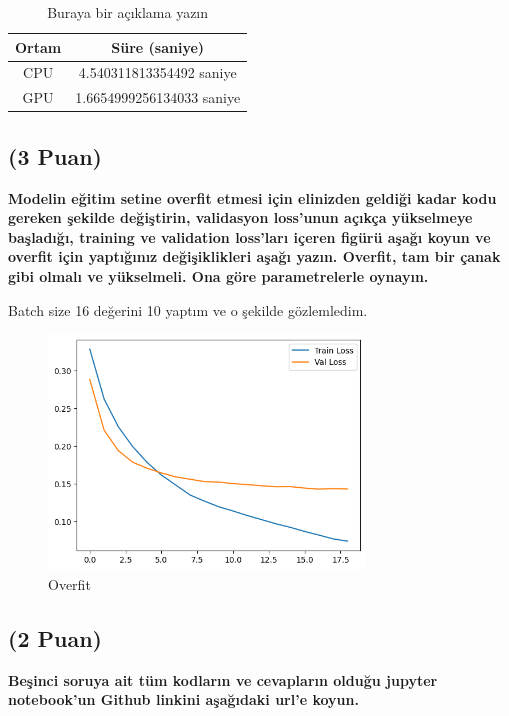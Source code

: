 \documentclass[11pt]{article}
\begin{document}
\begin{table}[ht!]
    \centering
    \caption{Buraya bir açıklama yazın}
    \begin{tabular}{c|c}
        Ortam & Süre (saniye) \\\hline
        CPU & 4.540311813354492 saniye \\
        GPU & 1.6654999256134033 saniye\\
    \end{tabular}
    \label{tab:my_table}
\end{table}

\subsection{(3 Puan)} \textbf{Modelin eğitim setine overfit etmesi için elinizden geldiği kadar kodu gereken şekilde değiştirin, validasyon loss'unun açıkça yükselmeye başladığı, training ve validation loss'ları içeren figürü aşağı koyun ve overfit için yaptığınız değişiklikleri aşağı yazın. Overfit, tam bir çanak gibi olmalı ve yükselmeli. Ona göre parametrelerle oynayın.}

Batch size 16 değerini 10 yaptım ve o şekilde gözlemledim.


\begin{figure}[ht!]
    \centering
    \includegraphics[width=0.75\textwidth]{resim2.png}
    \caption{Overfit}
    \label{fig:my_pic}
\end{figure}


\subsection{(2 Puan)} \textbf{Beşinci soruya ait tüm kodların ve cevapların olduğu jupyter notebook'un Github linkini aşağıdaki url'e koyun.}
\end{document}

